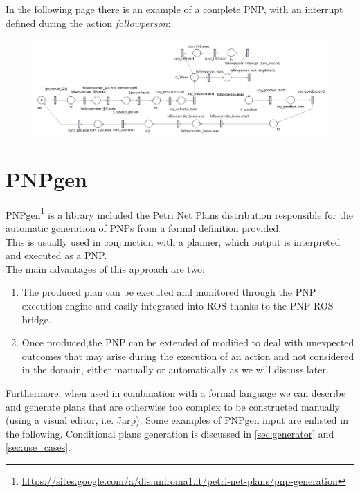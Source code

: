 \documentclass[pdftex,12pt,a4paper]{report}
\begin{document}
\noindent In the following page there is an example of a complete PNP, with an interrupt defined during the action \textit{followperson}:
\newline
\begin{figure}[H]
	\centering
	\includegraphics[scale=0.4,  trim=20mm 10mm 10mm 10mm]{images/go_and_follow_person.png} %
\end{figure}

\section{PNPgen}
PNPgen\footnote{\url{https://sites.google.com/a/dis.uniroma1.it/petri-net-plans/pnp-generation}}\cite{carlucci2015explicit}%
is a library included the Petri Net Plans distribution responsible for the automatic generation of PNPs from a formal definition provided.\\
This is usually used in conjunction with a planner, which output is interpreted and executed as a PNP.\\
The main advantages of this approach are two:
\begin{enumerate}
\item The produced plan can be executed and monitored through the PNP execution engine and easily integrated into ROS thanks to the PNP-ROS bridge.
\item Once produced,the PNP can be extended of modified to deal with unexpected outcomes that may arise during the execution of an action and not considered in the domain, either manually or automatically as we will discuss later.
\end{enumerate} 

\noindent Furthermore, when used in combination with a formal language we can describe and generate plans that are otherwise too complex to be constructed manually (using a visual editor, i.e. Jarp).
Some examples of PNPgen input are enlisted in the following. Conditional plans generation is discussed in \ref{sec:generator} and \ref{sec:use_cases}.
\end{document}
